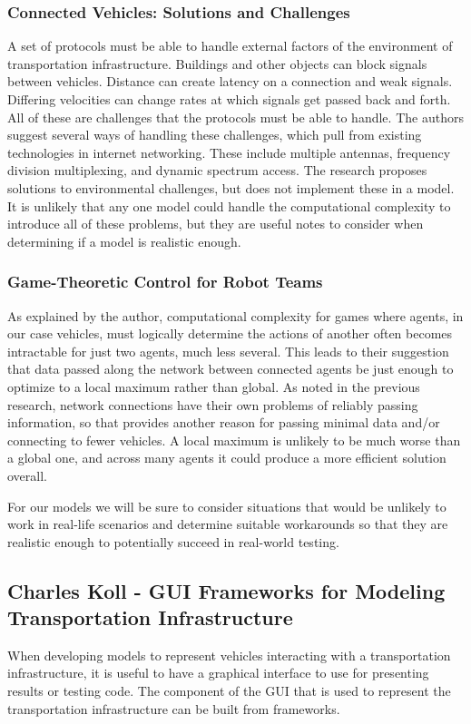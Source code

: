 \documentclass[onecolumn, draftclsnofoot,10pt, compsoc]{IEEEtran}
\begin{document}
\subsubsection{Connected Vehicles: Solutions and Challenges \cite{lu2014connected}}
A set of protocols must be able to handle external factors of the environment of transportation infrastructure.
Buildings and other objects can block signals between vehicles.
Distance can create latency on a connection and weak signals.
Differing velocities can change rates at which signals get passed back and forth.
All of these are challenges that the protocols must be able to handle.
The authors suggest several ways of handling these challenges, which pull from existing technologies in internet networking.
These include multiple antennas, frequency division multiplexing, and dynamic spectrum access.
The research proposes solutions to environmental challenges, but does not implement these in a model.
It is unlikely that any one model could handle the computational complexity to introduce all of these problems, but they are useful notes to consider when determining if a model is realistic enough.
\subsubsection{Game-Theoretic Control for Robot Teams \cite{emery2005game}}
As explained by the author, computational complexity for games where agents, in our case vehicles, must logically determine the actions of another often becomes intractable for just two agents, much less several.
This leads to their suggestion that data passed along the network between connected agents be just enough to optimize to a local maximum rather than global.
As noted in the previous research, network connections have their own problems of reliably passing information, so that provides another reason for passing minimal data and/or connecting to fewer vehicles.
A local maximum is unlikely to be much worse than a global one, and across many agents it could produce a more efficient solution overall.

For our models we will be sure to consider situations that would be unlikely to work in real-life scenarios and determine suitable workarounds so that they are realistic enough to potentially succeed in real-world testing.
\subsection{Charles Koll - GUI Frameworks for Modeling Transportation Infrastructure}
When developing models to represent vehicles interacting with a transportation infrastructure, it is useful to have a graphical interface to use for presenting results or testing code.
The component of the GUI that is used to represent the transportation infrastructure can be built from frameworks.
\end{document}
